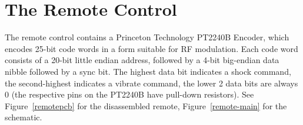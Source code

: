 \documentclass[a4paper]{article}
\begin{document}
\section{The Remote Control}

The remote control contains a Princeton Technology PT2240B Encoder, which encodes 25-bit code words in a form suitable for RF modulation. Each code word consists of a 20-bit little endian address, followed by a 4-bit big-endian data nibble followed by a sync bit. The highest data bit indicates a shock command, the second-highest indicates a vibrate command, the lower 2 data bits are always 0 (the respective pins on the PT2240B have pull-down resistors). See Figure~\ref{remotepcb} for the disassembled remote, Figure~\ref{remote-main} for the schematic.

\begin{figure}

\end{figure}
\end{document}
